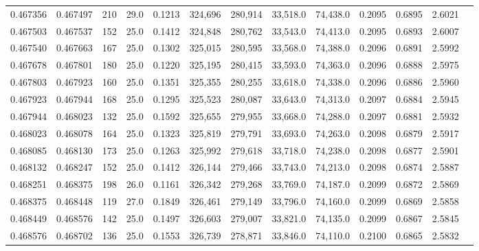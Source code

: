 \begin{tabular}{rrrrrrrrrrrrr}
0.467356 & 0.467497 &   210 & 29.0 &                                     0.1213 & 324,696 & 280,914 &  33,518.0 &  74,438.0 & 0.2095 & 0.6895 & 2.6021 \\
0.467503 & 0.467537 &   152 & 25.0 &                                     0.1412 & 324,848 & 280,762 &  33,543.0 &  74,413.0 & 0.2095 & 0.6893 & 2.6007 \\
0.467540 & 0.467663 &   167 & 25.0 &                                     0.1302 & 325,015 & 280,595 &  33,568.0 &  74,388.0 & 0.2096 & 0.6891 & 2.5992 \\
0.467678 & 0.467801 &   180 & 25.0 &                                     0.1220 & 325,195 & 280,415 &  33,593.0 &  74,363.0 & 0.2096 & 0.6888 & 2.5975 \\
0.467803 & 0.467923 &   160 & 25.0 &                                     0.1351 & 325,355 & 280,255 &  33,618.0 &  74,338.0 & 0.2096 & 0.6886 & 2.5960 \\
0.467923 & 0.467944 &   168 & 25.0 &                                     0.1295 & 325,523 & 280,087 &  33,643.0 &  74,313.0 & 0.2097 & 0.6884 & 2.5945 \\
0.467944 & 0.468023 &   132 & 25.0 &                                     0.1592 & 325,655 & 279,955 &  33,668.0 &  74,288.0 & 0.2097 & 0.6881 & 2.5932 \\
0.468023 & 0.468078 &   164 & 25.0 &                                     0.1323 & 325,819 & 279,791 &  33,693.0 &  74,263.0 & 0.2098 & 0.6879 & 2.5917 \\
0.468085 & 0.468130 &   173 & 25.0 &                                     0.1263 & 325,992 & 279,618 &  33,718.0 &  74,238.0 & 0.2098 & 0.6877 & 2.5901 \\
0.468132 & 0.468247 &   152 & 25.0 &                                     0.1412 & 326,144 & 279,466 &  33,743.0 &  74,213.0 & 0.2098 & 0.6874 & 2.5887 \\
0.468251 & 0.468375 &   198 & 26.0 &                                     0.1161 & 326,342 & 279,268 &  33,769.0 &  74,187.0 & 0.2099 & 0.6872 & 2.5869 \\
0.468375 & 0.468448 &   119 & 27.0 &                                     0.1849 & 326,461 & 279,149 &  33,796.0 &  74,160.0 & 0.2099 & 0.6869 & 2.5858 \\
0.468449 & 0.468576 &   142 & 25.0 &                                     0.1497 & 326,603 & 279,007 &  33,821.0 &  74,135.0 & 0.2099 & 0.6867 & 2.5845 \\
0.468576 & 0.468702 &   136 & 25.0 &                                     0.1553 & 326,739 & 278,871 &  33,846.0 &  74,110.0 & 0.2100 & 0.6865 & 2.5832 \\

\end{tabular}
